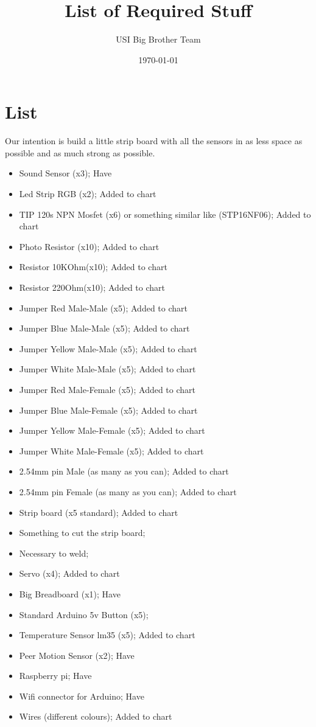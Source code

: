 \documentclass[12pt]{article}
\begin{document}
\title{List of Required Stuff}
\author{USI Big Brother Team}
\date{\today}
\maketitle
\section*{List}
Our intention is build a little strip board with all the sensors in as less space as possible and as much strong as possible.
\begin{itemize}
\item Sound Sensor (x3); Have \checkmark
\item Led Strip RGB (x2); Added to chart \checkmark
\item TIP 120s NPN Mosfet (x6) or something similar like (STP16NF06); Added to chart \checkmark
\item Photo Resistor (x10); Added to chart \checkmark
\item Resistor 10KOhm(x10); Added to chart \checkmark
\item Resistor 220Ohm(x10); Added to chart \checkmark
\item Jumper Red Male-Male (x5); Added to chart \checkmark
\item Jumper Blue Male-Male (x5); Added to chart \checkmark
\item Jumper Yellow Male-Male (x5); Added to chart \checkmark
\item Jumper White Male-Male (x5); Added to chart \checkmark
\item Jumper Red Male-Female (x5); Added to chart \checkmark
\item Jumper Blue Male-Female (x5); Added to chart \checkmark
\item Jumper Yellow Male-Female (x5); Added to chart \checkmark
\item Jumper White Male-Female (x5); Added to chart \checkmark
\item 2.54mm pin Male (as many as you can); Added to chart \checkmark
\item 2.54mm pin Female (as many as you can); Added to chart \checkmark
\item Strip board (x5 standard); Added to chart \checkmark
\item Something to cut the strip board;
\item Necessary to weld;
\item Servo (x4); Added to chart \checkmark
\item Big Breadboard (x1); Have\checkmark
\item Standard Arduino 5v Button (x5);
\item Temperature Sensor lm35 (x5); Added to chart \checkmark
\item Peer Motion Sensor (x2); Have\checkmark
\item Raspberry pi; Have\checkmark
\item Wifi connector for Arduino; Have\checkmark
\item Wires (different colours); Added to chart \checkmark

\end{itemize}
\end{document}
